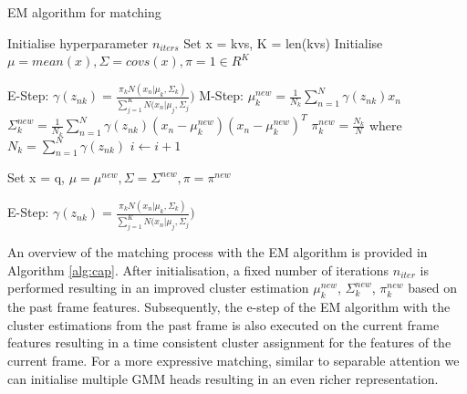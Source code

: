\vspace{5mm}
\begin{algorithm} [ht!]
\caption{EM algorithm for matching}\label{alg:cap}
\begin{algorithmic}[1]

\State Initialise hyperparameter $ n_{iters}$
\State Set x = kvs, K = len(kvs)  
\State Initialise $\mu = mean(x), \Sigma = covs(x), \pi = 1 \in {R^K}$

\State E-Step: $\gamma(z_{nk}) = \frac{\pi_{k}N(x_n|\mu_k, \Sigma_k)}{\sum_{j=1}^{K} N(x_n|\mu_j, \Sigma_j})$
\State M-Step: 
\State $\mu_{k}^{new} = \frac{1}{N_k}\sum_{n=1}^N \gamma(z_{nk}) x_n $ 
\State $\Sigma_k^{new} = \frac{1}{N_k} \sum_{n=1}^N \gamma(z_{nk}) (x_n - \mu_k^{new})(x_n - \mu_k^{new})^T $
\State $\pi_k^{new} = \frac{N_k}{N}$
\State where $N_k = \sum_{n=1}^N \gamma(z_{nk}) $
\State $i \gets i + 1$
\EndWhile

\State Set x = q, $\mu = \mu^{new}, \Sigma = \Sigma^{new}, \pi = \pi^{new} $

\State E-Step: $\gamma(z_{nk}) = \frac{\pi_{k}N(x_n|\mu_k, \Sigma_k)}{\sum_{j=1}^{K} N(x_n|\mu_j, \Sigma_j})$

\end{algorithmic}
\end{algorithm}
\vspace{5mm}

An overview of the matching process with the EM algorithm is provided in Algorithm \ref{alg:cap}. After initialisation, a fixed number of iterations $n_{iter}$ is performed resulting in an improved cluster estimation $\mu_k^{new}$, $\Sigma_k^{new}$, $\pi_k^{new}$ based on the past frame features. Subsequently, the e-step of the EM algorithm with the cluster estimations from the past frame is also executed on the current frame features resulting in a time consistent cluster assignment for the features of the current frame. 
For a more expressive matching, similar to separable attention we can initialise multiple GMM heads resulting in an even richer representation. 
\par

